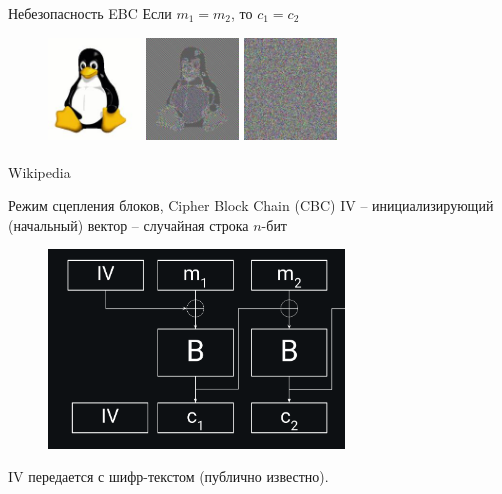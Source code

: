 \documentclass[usenames,dvipsnames,8pt,aspectratio=169]{beamer}
\begin{document}
\begin{frame}{Небезопасность EBC}
\centering
\Huge Если $m_1 = m_2$, то $c_1 = c_2$ \\[20pt]
\large
\begin{figure}
	\includegraphics[width=0.22\textwidth]{Tux} \quad 
	\includegraphics[width=0.22\textwidth]{Tux_ecb} \quad 
	\includegraphics[width=0.22\textwidth]{Tux_secure}
\end{figure}

\vfill
\small
{\color{gray} \textsuperscript{\textcopyright} Wikipedia} 
\end{frame}

\begin{frame}{Режим сцепления блоков, Cipher Block Chain (CBC)}
\Large
{\color{Orange} IV} -- инициализирующий (начальный) вектор -- случайная строка $n$-бит

\begin{figure}
	\includegraphics[width=0.7\textwidth]{CBC}
\end{figure}
IV передается с шифр-текстом (публично известно).
\end{frame}
\end{document}

